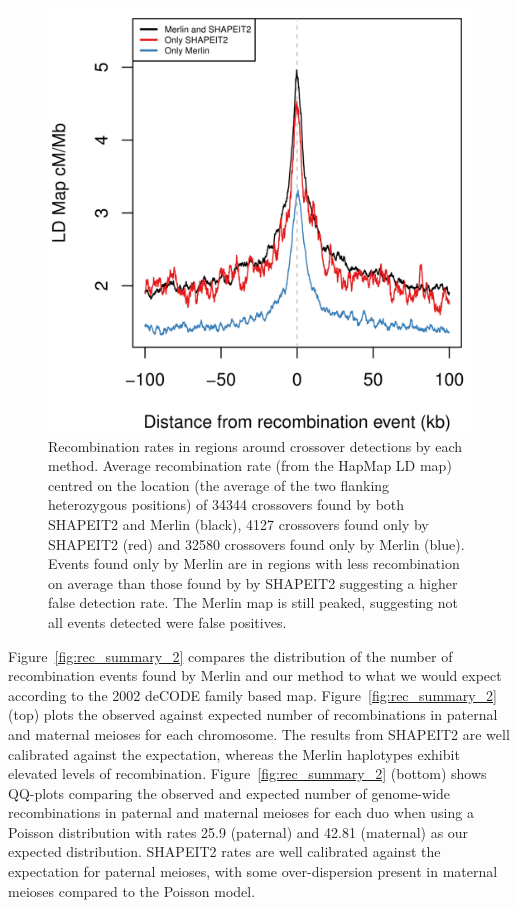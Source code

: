 \begin{figure}
\centering
   \includegraphics[width=.5\textwidth]{chap4figs/recombination_rate}
  \caption[HapMap recombination rates around detected crossover events]{Recombination rates in regions around crossover detections by each method. Average recombination rate (from the HapMap LD map) centred on the location (the average of the two flanking heterozygous positions) of 34344 crossovers found by both SHAPEIT2 and Merlin (black), 4127 crossovers found only by SHAPEIT2 (red) and 32580 crossovers found only by Merlin (blue).  Events found only by Merlin are in regions with less recombination on average than those found by by SHAPEIT2 suggesting a higher false detection rate. The Merlin map is still peaked, suggesting not all events detected were false positives.\label{fig:avg_map}}
\end{figure}
\newpage
 Figure~\ref{fig:rec_summary_2} compares the distribution of the number of recombination events found by Merlin and our method to what we would expect according to the 2002 deCODE family based map. Figure~\ref{fig:rec_summary_2} (top) plots the observed against expected number of recombinations in paternal and maternal meioses for each chromosome.  The results from SHAPEIT2 are  well calibrated against the expectation, whereas the Merlin haplotypes exhibit elevated levels of recombination.  Figure~\ref{fig:rec_summary_2} (bottom) shows  QQ-plots comparing the observed and expected number of genome-wide recombinations in paternal and maternal meioses for each duo when using a Poisson distribution with rates 25.9 (paternal) and 42.81 (maternal) as our expected distribution.  SHAPEIT2 rates are well calibrated against the expectation for paternal meioses, with some over-dispersion present in maternal meioses compared to the Poisson model. 

